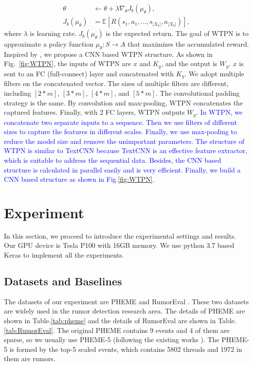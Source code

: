 \documentclass[review]{elsarticle}
\begin{document}
\begin{align}
\theta &\leftarrow \theta + \lambda \nabla_\theta J_b(\mu_\theta),\\
J_b(\mu_\theta) &= \mathbb{E} [R(s_1, a_1, ..., s_{|X_b|},a_{|X_b|}) ],
\end{align}
where $\lambda$ is learning rate. $J_b(\mu_\theta)$ is the expected return.
The goal of WTPN is to approximate a policy function $\mu_\theta :S \to A$ that maximizes the accumulated reward.  Inspired by \cite{DBLP:conf/aaai/KimJSR16}, we propose a CNN based WTPN structure. As shown in Fig.~\ref{fig:WTPN}, the inputs of WTPN are $x$ and $K_y$, and the output is $W_y$. $x$ is sent to an FC (full-connect) layer and concatenated with $K_y$. We adopt multiple filters on the concatenated vector. The sizes of multiple filters are different, including  $[2*m]$, $[3*m]$, $[4*m]$, and $[5*m]$. The convolutional padding strategy is the same. By convolution and max-pooling, WTPN concatenates the captured features. Finally, with 2 FC layers, WTPN outputs $W_y$. \textcolor{blue}{In WTPN, we concatenate two separate inputs to a sequence. Then we use filters of different sizes to capture the features in different scales. Finally, we use max-pooling to reduce the model size and remove the unimportant parameters. The structure of WTPN is similar to TextCNN because TextCNN is an effective feature extractor, which is suitable to address the sequential data. Besides, the CNN based structure is calculated in parallel easily and is very efficient. Finally, we build a CNN based structure as shown in Fig.\ref{fig:WTPN}.}

\section{Experiment}
\label{sec:experiment}
In this section, we proceed to introduce the experimental settings and results. Our GPU device is Tesla P100 with 16GB memory. We use python 3.7 based Keras to implement all the experiments.

\subsection{Datasets and Baselines}
\label{sec:dataset}
The datasets of our experiment are  PHEME \cite{DBLP:conf/coling/KochkinaLZ18} and RumorEval \cite{DBLP:conf/semeval/EnayetE17}. These two datasets are widely used in the rumor detection research area. The details of PHEME are shown in Table.\ref{tab:pheme} and the details of RumorEval are shown in Table.\ref{tab:RumorEval}. The original PHEME contains 9 events and 4 of them are sparse, so we usually use PHEME-5 (following the existing works \cite{DBLP:conf/www/ChengNB20}). The PHEME-5 is formed by the top-5 scaled events, which contains 5802 threads and 1972 in them are rumors. 
\end{document}
